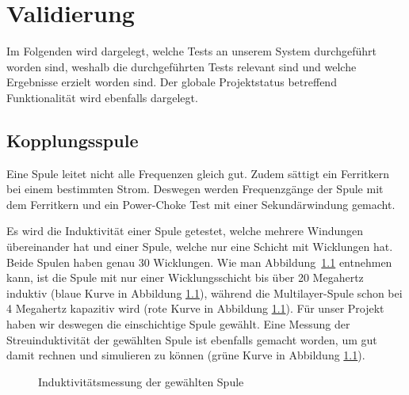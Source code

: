\chapter{Validierung}
\label{chap:validierung}

Im Folgenden  wird dargelegt,  welche Tests  an unserem  System durchgef\"uhrt
worden  sind, weshalb  die  durchgef\"uhrten Tests  relevant  sind und  welche
Ergebnisse   erzielt  worden   sind. Der   globale  Projektstatus   betreffend
Funktionalit\"at wird ebenfalls dargelegt.

\section{Kopplungsspule}
\label{sec:val:coupling:coil}

Eine  Spule  leitet nicht  alle  Frequenzen  gleich gut. Zudem  s\"attigt  ein
Ferritkern  bei einem  bestimmten Strom. Deswegen  werden Frequenzg\"ange  der
Spule mit dem Ferritkern und  ein Power-Choke Test mit einer Sekund\"arwindung
gemacht.

Es   wird   die   Induktivit\"at   einer  Spule   getestet,   welche   mehrere
Windungen  \"ubereinander  hat  und  einer  Spule,  welche  nur  eine  Schicht
mit  Wicklungen   hat. Beide  Spulen   haben  genau  30   Wicklungen. Wie  man
Abbildung~\ref{fig:meas:coupling:coil:L}  entnehmen kann,  ist  die Spule  mit
nur  einer Wicklungsschicht  bis  \"uber 20  Megahertz  induktiv (blaue  Kurve
in Abbildung  \ref{fig:meas:coupling:coil:L}), w\"ahrend  die Multilayer-Spule
schon   bei   4   Megahertz   kapazitiv  wird   (rote   Kurve   in   Abbildung
\ref{fig:meas:coupling:coil:L}). F\"ur  unser   Projekt  haben   wir  deswegen
die  einschichtige  Spule   gew\"ahlt. Eine  Messung  der  Streuinduktivit\"at
der   gew\"ahlten  Spule   ist  ebenfalls   gemacht  worden,   um  gut   damit
rechnen   und   simulieren   zu   k\"onnen   (gr\"une   Kurve   in   Abbildung
\ref{fig:meas:coupling:coil:L}).

\clearpage
\begin{figure}[h!tb]
    \centering
    
    \caption[Messresultate Kopplungsspule: Induktivit\"at]{Induktivit\"atsmessung der gew\"ahlten Spule}
    \label{fig:meas:coupling:coil:L}
\end{figure}


